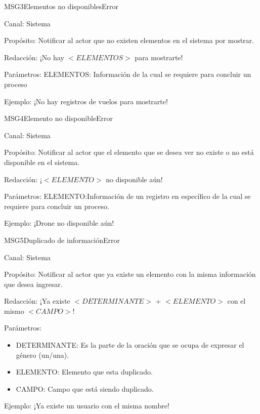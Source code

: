 \begin{mensaje}{MSG3}{Elementos no disponibles}{Error}
	\item[Canal:] Sistema
	\item[Propósito:] Notificar al actor que no existen elementos en el sistema por mostrar.
	\item[Redacción:] ¡No hay $<ELEMENTOS>$ para mostrarte!
	\item[Parámetros:] ELEMENTOS: Información de la cual se requiere para concluir un proceso
	\item[Ejemplo:] ¡No hay registros de vuelos para mostrarte!
\end{mensaje}

\begin{mensaje}{MSG4}{Elemento no disponible}{Error}
	\item[Canal:] Sistema
	\item[Propósito:] Notificar al actor que el elemento que se desea ver no existe o no está disponible en el sistema.
	\item[Redacción:] ¡$<ELEMENTO>$ no disponible aún!
	\item[Parámetros:] ELEMENTO:Información de un registro en específico de la cual se requiere para concluir un proceso.
	\item[Ejemplo:] ¡Drone no disponible aún!
\end{mensaje}

\begin{mensaje}{MSG5}{Duplicado de información}{Error}
	\item[Canal:] Sistema
	\item[Propósito:] Notificar al actor que ya existe un elemento con la misma información que desea ingresar.
	\item[Redacción:] ¡Ya existe $<DETERMINANTE>$ + $<ELEMENTO>$ con el mismo $<CAMPO>$!
	\item[Parámetros:] \cdtEmpty
	\begin{itemize}
		\item DETERMINANTE: Es la parte de la oración que se ocupa de expresar el género (un/una).
		\item ELEMENTO: Elemento que esta duplicado.
		\item CAMPO: Campo que está siendo duplicado.
	\end{itemize}
	\item[Ejemplo:]¡Ya existe un usuario con el misma nombre!
\end{mensaje}


